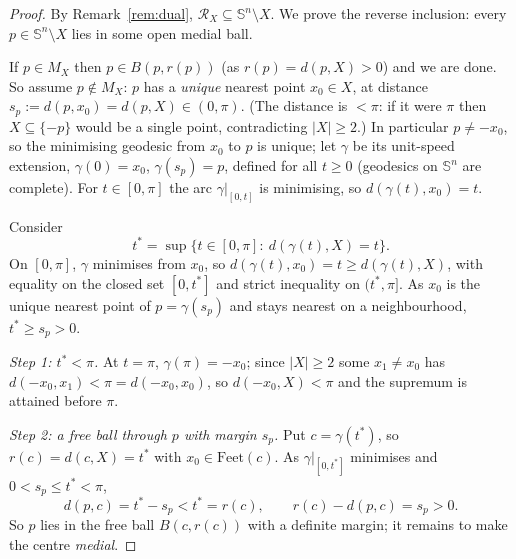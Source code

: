 \documentclass[11pt]{article}
\theoremstyle{remark}
\newcommand{\X}{X}
\newcommand{\Mx}{M_{\X}}
\newcommand{\Rx}{\mathcal{R}_{\X}}
\newcommand{\Sn}{\mathbb{S}^{n}}
\begin{document}
\begin{proof}
By Remark~\ref{rem:dual}, $\Rx\subseteq\Sn\setminus\X$. We prove the
reverse inclusion: every $p\in\Sn\setminus\X$ lies in some open medial
ball.

If $p\in\Mx$ then $p\in B(p,r(p))$ (as $r(p)=d(p,\X)>0$) and we are done.
So assume $p\notin\Mx$: $p$ has a \emph{unique} nearest point
$x_{0}\in\X$, at distance $s_{p}:=d(p,x_{0})=d(p,\X)\in(0,\pi)$. (The
distance is $<\pi$: if it were $\pi$ then $\X\subseteq\{-p\}$ would be a
single point, contradicting $|\X|\ge2$.) In particular $p\neq-x_{0}$, so
the minimising geodesic from $x_{0}$ to $p$ is unique; let $\gamma$ be its
unit-speed extension, $\gamma(0)=x_{0}$, $\gamma(s_{p})=p$, defined for all
$t\ge0$ (geodesics on $\Sn$ are complete). For $t\in[0,\pi]$ the arc
$\gamma|_{[0,t]}$ is minimising, so $d(\gamma(t),x_{0})=t$.

Consider
\[
  t^{\ast}=\sup\{t\in[0,\pi]:\ d(\gamma(t),\X)=t\}.
\]
On $[0,\pi]$, $\gamma$ minimises from $x_{0}$, so $d(\gamma(t),x_{0})=t\ge
d(\gamma(t),\X)$, with equality on the closed set $[0,t^{\ast}]$ and strict
inequality on $(t^{\ast},\pi]$. As $x_{0}$ is the unique nearest point of
$p=\gamma(s_{p})$ and stays nearest on a neighbourhood, $t^{\ast}\ge
s_{p}>0$.

\emph{Step 1: $t^{\ast}<\pi$.} At $t=\pi$, $\gamma(\pi)=-x_{0}$; since
$|\X|\ge2$ some $x_{1}\neq x_{0}$ has $d(-x_{0},x_{1})<\pi=d(-x_{0},x_{0})$,
so $d(-x_{0},\X)<\pi$ and the supremum is attained before $\pi$.

\emph{Step 2: a free ball through $p$ with margin $s_{p}$.} Put
$c=\gamma(t^{\ast})$, so $r(c)=d(c,\X)=t^{\ast}$ with $x_{0}\in
\mathrm{Feet}(c)$. As $\gamma|_{[0,t^{\ast}]}$ minimises and $0<s_{p}\le
t^{\ast}<\pi$,
\begin{equation}\label{eq:margin}
  d(p,c)=t^{\ast}-s_{p}<t^{\ast}=r(c),\qquad r(c)-d(p,c)=s_{p}>0 .
\end{equation}
So $p$ lies in the free ball $B(c,r(c))$ with a definite margin; it remains
to make the centre \emph{medial}.


\end{proof}
\end{document}
